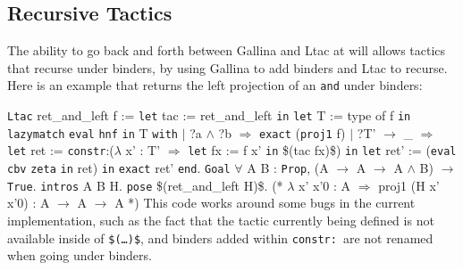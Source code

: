 \documentclass{article}
\makeatletter
\gdef\@makeopenbrace<\catcode`{>
\gdef\@makeclosebrace<\catcode`}>
\newcommand{\processcommands}[1]{{%
  \catcode`\\=0\relax
  \@makeopenbrace=1\relax
  \@makeclosebrace=2\relax
  \def\{{\texttt{\mytextbraceleft}}
  \def\}{\texttt{\mytextbraceright}}
  \scantokens{#1}%
}}
\newcommand{\processcommandsinverbatimline}{\expandafter\processcommands\expandafter{\the\verbatim@line}}
\newenvironment{coqcode}{\begingroup
  \vspace{0.5\baselineskip}
  \let\trivlist\relax
  \let\endtrivlist\relax
  \let\item\relax
  \setlength{\parsep}{0pt}%
  \setlength{\parskip}{0pt}%
  \setlength{\topsep}{0pt}%
  \setlength{\@topsepadd}{0pt}%
  \setlength{\partopsep}{0pt}%
  \setlength{\@topsep}{0pt}%
  \let\old@@par\@@par
  \let\@@par\relax
  \let\old@vskip\vskip
  \let\vskip\relax
  \verbatim
  \let\@@par\old@@par
  \let\vskip\old@vskip
  \let\verbatim@processline=\processcommandsinverbatimline
}{\endverbatim\endgroup\vspace{0.5\baselineskip}}
\newcommand{\coqdockw}[1]{\texttt {\textcolor{kwred}{#1}}}
\newcommand{\coqdocvar}[1]{\textcolor{varpurple}{#1}}
\newcommand{\coqdoccst}[1]{\texttt{\textcolor{defgreen}{#1}}}%
\newcommand{\coqdocind}[1]{\texttt{\textcolor{indblue}{#1}}}%
\newcommand{\coqdoctac}[1]{\texttt{#1}}
\newcommand{\coqdocinductive}[1]{\coqdocind{#1}}
\newcommand{\coqdoclemma}[1]{\coqdoccst{#1}}
\newcommand{\coqdocnotation}[1]{\coqdockw{#1}}
\makeatother
\begin{document}
\subsection{Recursive Tactics}
The ability to go back and forth between Gallina and Ltac at will allows tactics that recurse under binders, by using Gallina to add binders and Ltac to recurse. Here is an example that returns the left projection of an \texttt{and} under binders:
\begin{coqcode}
\coqdockw{Ltac} \coqdocvar{ret_and_left} \coqdocvar{f} :=
  \coqdockw{let} \coqdocvar{tac} := \coqdocvar{ret_and_left} \coqdoctac{in}
  \coqdockw{let} \coqdocvar{T} := \coqdocvar{type} \coqdocvar{of} \coqdocvar{f} \coqdoctac{in}
  \coqdockw{lazymatch} \coqdoctac{eval} \coqdoctac{hnf} \coqdoctac{in} \coqdocvar{T} \coqdockw{with}
    \ensuremath{|} ?\coqdocvar{a} \coqdocnotation{\ensuremath{\land}} ?\coqdocvar{b} \ensuremath{\Rightarrow} \coqdoctac{exact} (\coqdoclemma{proj1} \coqdocvar{f})
    \ensuremath{|} ?\coqdocvar{T'} \coqdocnotation{\ensuremath{\rightarrow}} \coqdocvar{_}
      \ensuremath{\Rightarrow} \coqdockw{let} \coqdocvar{ret} := \coqdockw{constr}:(\coqdockw{\ensuremath{\lambda}} \coqdocvar{x'} : \coqdocvar{T'} \ensuremath{\Rightarrow} \coqdockw{let} \coqdocvar{fx} := \coqdocvar{f} \coqdocvar{x'} \coqdoctac{in} \$(\coqdocvar{tac} \coqdocvar{fx})\$) \coqdoctac{in}
         \coqdockw{let} \coqdocvar{ret'} := (\coqdoctac{eval} \coqdoctac{cbv} \coqdockw{zeta} \coqdoctac{in} \coqdocvar{ret})  \coqdoctac{in}
         \coqdoctac{exact} \coqdocvar{ret'}
    \coqdockw{end}.
\coqdockw{Goal} \coqdockw{\ensuremath{\forall}} \coqdocvar{A} \coqdocvar{B} : \coqdockw{Prop}, (\coqdocvar{A} \coqdocnotation{\ensuremath{\rightarrow}} \coqdocvar{A} \coqdocnotation{\ensuremath{\rightarrow}} \coqdocvar{A} \coqdocnotation{\ensuremath{\land}} \coqdocvar{B}) \coqdocnotation{\ensuremath{\rightarrow}} \coqdocinductive{True}.
  \coqdoctac{intros} \coqdocvar{A} \coqdocvar{B} \coqdocvar{H}.
  \coqdoctac{pose} \$(\coqdocvar{ret_and_left} \coqdocvar{H})\$.
  (* \ensuremath{\lambda} {x'} {x'0} : {A} \ensuremath{\Rightarrow} {proj1} ({H} {x'} {x'0}) : {A} {\ensuremath{\rightarrow}} {A} {\ensuremath{\rightarrow}} {A} *)
\end{coqcode}
This code works around some bugs in the current implementation, such as the fact that the tactic currently being defined is not available inside of \texttt{\$(\ldots)\$}, and binders added within \texttt{constr:}~are not renamed when going under binders.
\end{document}

